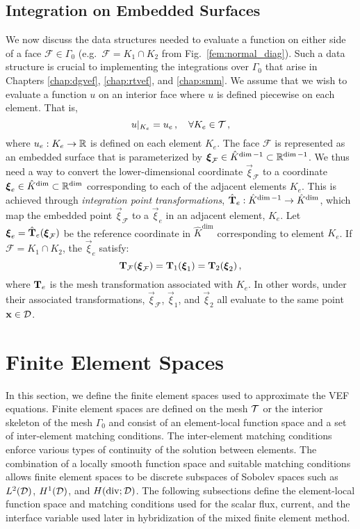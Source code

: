 \documentclass[../doc.tex]{subfiles}
\begin{document}
\subsection{Integration on Embedded Surfaces}
We now discuss the data structures needed to evaluate a function on either side of a face $\mathcal{F} \in \Gamma_0$ (e.g.~$\mathcal{F} =K_1 \cap K_2$ from Fig.~\ref{fem:normal_diag}). Such a data structure is crucial to implementing the integrations over $\Gamma_0$ that arise in Chapters \ref{chap:dgvef}, \ref{chap:rtvef}, and \ref{chap:smm}. We assume that we wish to evaluate a function $u$ on an interior face where $u$ is defined piecewise on each element. That is, 
	\begin{equation}
		u|_{K_e} = u_e \,, \quad \forall K_e \in \mathcal{T} \,, 
	\end{equation}
where $u_e : K_e \rightarrow \mathbb{R}$ is defined on each element $K_e$. The face $\mathcal{F}$ is represented as an embedded surface that is parameterized by $\boldsymbol{\xi}_\mathcal{F} \in \hat{K}^{\dim-1} \subset \mathbb{R}^{\dim-1}$. We thus need a way to convert the lower-dimensional coordinate $\vec{\xi}_\mathcal{F}$ to a coordinate $\boldsymbol{\xi}_e\in \hat{K}^{\dim} \subset \mathbb{R}^{\dim}$ corresponding to each of the adjacent elements $K_e$. This is achieved through \emph{integration point transformations}, $\hat{\boldsymbol{\mathrm{T}}}_e : \hat{K}^{\dim-1} \rightarrow \hat{K}^{\dim}$, which map the embedded point $\vec{\xi}_\mathcal{F}$ to a $\vec{\xi}_e$ in an adjacent element, $K_e$. Let $\boldsymbol{\xi}_e = \hat{\boldsymbol{\mathrm{T}}}_e(\boldsymbol{\xi}_\mathcal{F})$ be the reference coordinate in $\hat{K}^{\dim}$ corresponding to element $K_e$. If $\mathcal{F} = K_1 \cap K_2$, the $\vec{\xi}_e$ satisfy: 
	\begin{equation}
		\boldsymbol{\mathrm{T}}_\mathcal{F}(\boldsymbol{\xi}_\mathcal{F}) = \boldsymbol{\mathrm{T}}_1(\boldsymbol{\xi}_1) = \boldsymbol{\mathrm{T}}_2(\boldsymbol{\xi}_2) \,,
	\end{equation}
where $\boldsymbol{\mathrm{T}}_e$ is the mesh transformation associated with $K_e$. In other words, under their associated transformations, $\vec{\xi}_\mathcal{F}$, $\vec{\xi}_1$, and $\vec{\xi}_2$ all evaluate to the same point $\boldsymbol{\mathrm{x}} \in \mathcal{D}$. 

\section{Finite Element Spaces} \label{fem_sec:fes}
In this section, we define the finite element spaces used to approximate the VEF equations. Finite element spaces are defined on the mesh $\mathcal{T}$ or the interior skeleton of the mesh $\Gamma_0$ and consist of an element-local function space and a set of inter-element matching conditions. 
The inter-element matching conditions enforce various types of continuity of the solution between elements. The combination of a locally smooth function space and suitable matching conditions allows finite element spaces to be discrete subspaces of Sobolev spaces such as $L^2(\mathcal{D})$, $H^1(\mathcal{D})$, and $H(\operatorname{div};\mathcal{D})$. The following subsections define the element-local function space and matching conditions used for the scalar flux, current, and the interface variable used later in hybridization of the mixed finite element method. 
\end{document}
